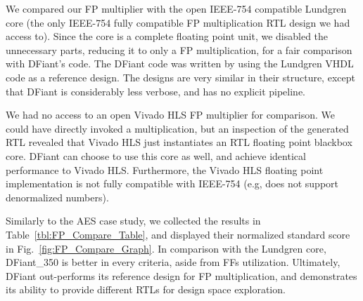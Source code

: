 We compared our FP multiplier with the open IEEE-754 compatible Lundgren core \cite{lundgren2014open} (the only IEEE-754 fully compatible FP multiplication RTL design we had access to). Since the core is a complete floating point unit, we disabled the unnecessary parts, reducing it to only a FP multiplication, for a fair comparison with DFiant's code. The DFiant code was written by using the Lundgren VHDL code as a reference design. The designs are very similar in their structure, except that DFiant is considerably less verbose, and has no explicit pipeline.

We had no access to an open Vivado HLS FP multiplier for comparison. We could have directly invoked a  multiplication, but an inspection of the generated RTL revealed that Vivado HLS just instantiates an RTL floating point blackbox core. DFiant can choose to use this core as well, and achieve identical performance to Vivado HLS. Furthermore, the Vivado HLS floating point implementation is not fully compatible with IEEE-754 (e.g, does not support denormalized numbers).

Similarly to the AES case study, we collected the results in Table~\ref{tbl:FP_Compare_Table}, and displayed their normalized standard score in Fig.~\ref{fig:FP_Compare_Graph}. In comparison with the Lundgren core, DFiant\_350 is better in every criteria, aside from FFs utilization. Ultimately, DFiant out-performs its reference design for FP multiplication, and demonstrates its ability to provide different RTLs for design space exploration.

